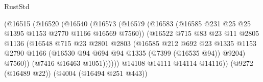 \begin{lexlean}{RustStd}
\begin{coremodule}
                                (@16515
                                  (@16520
                                    (@16540
                                      (@16573
                                        (@16579
                                          (@16583
                                            (@16585
                                              @231
                                              @25
                                              @25
                                              @1395
                                              @1153
                                              @2770
                                              @1166
                                              @16569
                                              @7560))
                                          (@16522
                                            @715
                                            @83
                                            @23
                                            @11
                                            @2805
                                            @1136
                                            (@16548
                                              @715
                                              @23
                                              @2801
                                              @2803
                                              (@16585
                                                @212
                                                @692
                                                @23
                                                @1335
                                                @1153
                                                @2790
                                                @1166
                                                (@16530
                                                  @94
                                                  @694
                                                  @94
                                                  @1335
                                                  (@7399 (@16535 @94))
                                                  @9204)
                                                @7560))
                                            (@7416 @16463 @1051))))))
                                  @14108
                                  @14111
                                  @14114
                                  @14116))
                              (@9272 (@16489 @22))
                              (@4004 (@16494 @251 @443))

\end{coremodule}
\end{lexlean}
